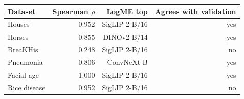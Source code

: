 \begin{tabular}{lrrr}
\toprule
Dataset & Spearman $\rho$ & LogME top & Agrees with validation\\
\midrule
Houses & 0.952 & SigLIP 2-B/16 & yes\\
Horses & 0.855 & DINOv2-B/14 & yes\\
BreaKHis & 0.248 & SigLIP 2-B/16 & no\\
Pneumonia & 0.806 & ConvNeXt-B & yes\\
Facial age & 1.000 & SigLIP 2-B/16 & yes\\
Rice disease & 0.952 & SigLIP 2-B/16 & no\\
\bottomrule
\end{tabular}
